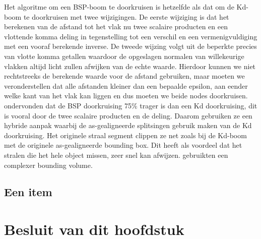 Het algoritme om een BSP-boom te doorkruisen is hetzelfde als dat om de Kd-boom te doorkruisen met twee wijzigingen.
De eerste wijziging is dat het berekenen van de afstand tot het vlak nu twee scalaire producten en een vlottende komma deling in tegenstelling tot een verschil en een vermenigvuldiging met een vooraf berekende inverse.
De tweede wijzing volgt uit de beperkte precies van vlotte komma getallen waardoor de opgeslagen normalen van willekeurige vlakken altijd licht zullen afwijken van de echte waarde.
Hierdoor kunnen we niet rechtstreeks de berekende waarde voor de afstand gebruiken, maar moeten we veronderstellen dat alle afstanden kleiner dan een bepaalde epsilon, aan eender welke kant van het vlak kan liggen en dus moeten we beide nodes doorkruisen.
\authorIze{ }ondervonden dat de BSP doorkruising 75\% trager is dan een Kd doorkruising, dit is vooral door de twee scalaire producten en de deling.
Daarom gebruiken ze een hybride aanpak waarbij de as-gealigneerde splitsingen gebruik maken van de Kd doorkruising.
Het originele straal segment clippen ze net zoals bij de Kd-boom met de originele as-gealigneerde bounding box.
Dit heeft als voordeel dat het stralen die het hele object missen, zeer snel kan afwijzen. 
\authorKammaje{ }gebruikten een complexer bounding volume.



\subsection{Een item}

\section{Besluit van dit hoofdstuk}
